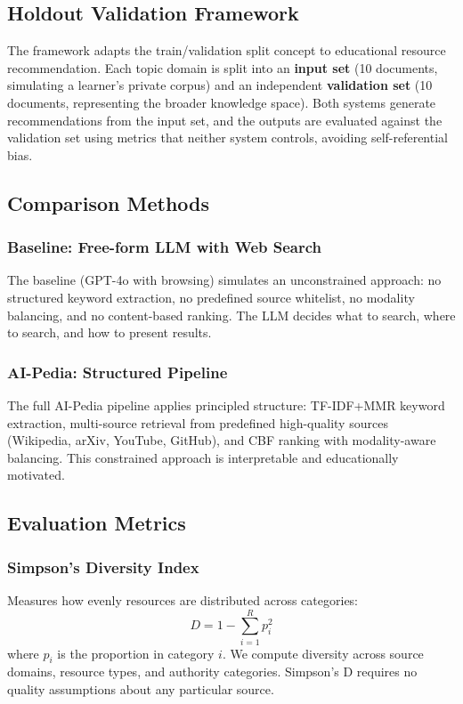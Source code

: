 \documentclass[10pt,journal,compsoc]{IEEEtran}
\begin{document}
\subsection{Holdout Validation Framework}

    The framework adapts the train/validation split concept to educational resource recommendation. Each topic domain is split into an \textbf{input set} (10 documents, simulating a learner's private corpus) and an independent \textbf{validation set} (10 documents, representing the broader knowledge space). Both systems generate recommendations from the input set, and the outputs are evaluated against the validation set using metrics that neither system controls, avoiding self-referential bias.

\subsection{Comparison Methods}

\subsubsection{Baseline: Free-form LLM with Web Search}
    The baseline (GPT-4o with browsing) simulates an unconstrained approach: no structured keyword extraction, no predefined source whitelist, no modality balancing, and no content-based ranking. The LLM decides what to search, where to search, and how to present results.

\subsubsection{AI-Pedia: Structured Pipeline}
    The full AI-Pedia pipeline applies principled structure: TF-IDF+MMR keyword extraction, multi-source retrieval from predefined high-quality sources (Wikipedia, arXiv, YouTube, GitHub), and CBF ranking with modality-aware balancing. This constrained approach is interpretable and educationally motivated.

\subsection{Evaluation Metrics}

\subsubsection{Simpson's Diversity Index}
    Measures how evenly resources are distributed across categories:
    $$D = 1 - \sum_{i=1}^{R} p_i^2$$
    where $p_i$ is the proportion in category $i$. We compute diversity across source domains, resource types, and authority categories. Simpson's D requires no quality assumptions about any particular source.
\end{document}
